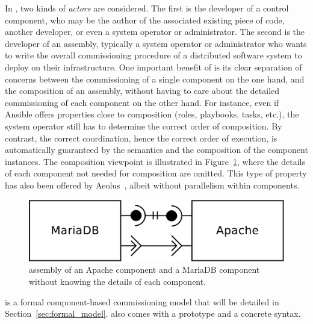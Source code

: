In \mad, two kinds of \emph{actors} are considered. The first is the
developer of a control component, who may be the author of the
associated existing piece of code, another developer, or even a
system operator or administrator. The second is the developer of an assembly,
typically a system operator or administrator who wants to write
the overall commissioning procedure of a distributed software system
to deploy on their infrastructure. One important benefit of \mad is
its clear separation of concerns between the commissioning of a single
component on the one hand, and the composition of an assembly, without
having to care about the detailed commissioning of each component on
the other hand. For instance, even if Ansible offers properties close
to composition (\eg roles, playbooks, tasks, etc.), the system operator
still has to determine the correct order of composition. By contrast, the
correct coordination, hence the correct order of execution, is
automatically guaranteed by the \mad semantics and the composition of
the component instances. The composition viewpoint is illustrated in
Figure~\ref{fig:simple}, where the details of each component not
needed for composition are omitted. This type of property has also been offered by
Aeolus~\cite{}, albeit without parallelism within components.

\begin{figure}[tbp]
  \begin{center}
    \includegraphics[width=0.6\linewidth]{./images/simpleass.pdf}
  \end{center}
  \caption{\mad assembly of an Apache component and a MariaDB
    component without knowing the details of each component.}
  \label{fig:simple}
\end{figure}

\mad is a formal component-based commissioning model that will be
detailed in Section~\ref{sec:formal_model}. \mad also comes with a
prototype and a concrete syntax.



